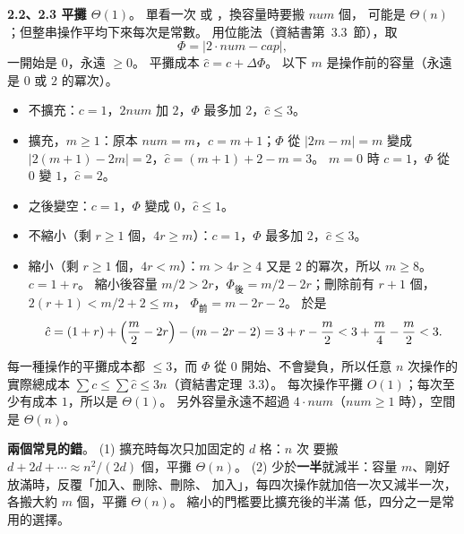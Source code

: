 \begin{pastsoln}
\textbf{2.2、2.3 平攤 $\Theta(1)$}。 單看一次  或 ，換容量時要搬 $\mathit{num}$ 個，
可能是 $\Theta(n)$；但整串操作平均下來每次是常數。 用位能法（資結書第~3.3~節），取
\[
\Phi = |2 \cdot \mathit{num} - \mathit{cap}|,
\]
一開始是 $0$，永遠 $\ge 0$。 平攤成本 $\hat{c} = c + \Delta\Phi$。 以下 $m$ 是操作前的容量（永遠是 $0$ 或
$2$ 的冪次）。
\begin{itemize}
\item {} 不擴充：$c = 1$，$2\mathit{num}$ 加 $2$，$\Phi$ 最多加 $2$，$\hat{c} \le 3$。
\item {} 擴充，$m \ge 1$：原本 $\mathit{num} = m$，$c = m + 1$；$\Phi$ 從 $|2m - m| = m$ 變成
$|2(m+1) - 2m| = 2$，$\hat{c} = (m + 1) + 2 - m = 3$。 $m = 0$ 時 $c = 1$，$\Phi$ 從 $0$ 變 $1$，$\hat{c} = 2$。
\item {} 之後變空：$c = 1$，$\Phi$ 變成 $0$，$\hat{c} \le 1$。
\item {} 不縮小（剩 $r \ge 1$ 個，$4r \ge m$）：$c = 1$，$\Phi$ 最多加 $2$，$\hat{c} \le 3$。
\item {} 縮小（剩 $r \ge 1$ 個，$4r < m$）：$m > 4r \ge 4$ 又是 $2$ 的冪次，所以 $m \ge 8$。 $c = 1 + r$。
縮小後容量 $m/2 > 2r$，$\Phi_{\text{後}} = m/2 - 2r$；刪除前有 $r + 1$ 個，$2(r+1) < m/2 + 2 \le m$，
$\Phi_{\text{前}} = m - 2r - 2$。 於是
\[
\hat{c} = (1 + r) + \Bigl(\frac{m}{2} - 2r\Bigr) - (m - 2r - 2) = 3 + r - \frac{m}{2} < 3 + \frac{m}{4} - \frac{m}{2} < 3.
\]
\end{itemize}
每一種操作的平攤成本都 $\le 3$，而 $\Phi$ 從 $0$ 開始、不會變負，所以任意 $n$ 次操作的實際總成本
$\sum c \le \sum \hat{c} \le 3n$（資結書定理~3.3）。 每次操作平攤 $O(1)$；每次至少有成本 $1$，所以是
$\Theta(1)$。 另外容量永遠不超過 $4 \cdot \mathit{num}$（$\mathit{num} \ge 1$ 時），空間是 $\Theta(n)$。

\textbf{兩個常見的錯}。 (1) 擴充時每次只加固定的 $d$ 格：$n$ 次  要搬 $d + 2d + \cdots \approx
n^2/(2d)$ 個，平攤 $\Theta(n)$。 (2) 少於\textbf{一半}就減半：容量 $m$、剛好放滿時，反覆「加入、刪除、刪除、
加入」，每四次操作就加倍一次又減半一次，各搬大約 $m$ 個，平攤 $\Theta(n)$。 縮小的門檻要比擴充後的半滿
低，四分之一是常用的選擇。
\end{pastsoln}
